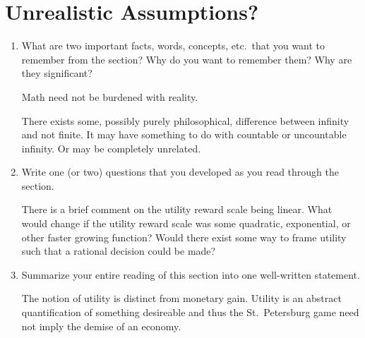 \documentclass[a4paper, 12pt]{config/homework}
\begin{document}
\section{Unrealistic Assumptions?}
\begin{enumerate}[label=\roman*.]
\item What are two important facts, words, concepts, etc.\ that you want to remember from the section? Why do you want to remember them? Why are they significant?

Math need not be burdened with reality.

There exists some, possibly purely philosophical, difference between infinity and not finite. It may have something to do with countable or uncountable infinity. Or may be completely unrelated.

\item Write one (or two) questions that you developed as you read through the section.

There is a brief comment on the utility reward scale being linear. What would change if the utility reward scale was some quadratic, exponential, or other faster growing function? Would there exist some way to frame utility such that a rational decision could be made?

\item Summarize your entire reading of this section into one well-written statement.

The notion of utility is distinct from monetary gain. Utility is an abstract quantification of something desireable and thus the St.\ Petersburg game need not imply the demise of an economy.

\end{enumerate}
\end{document}
